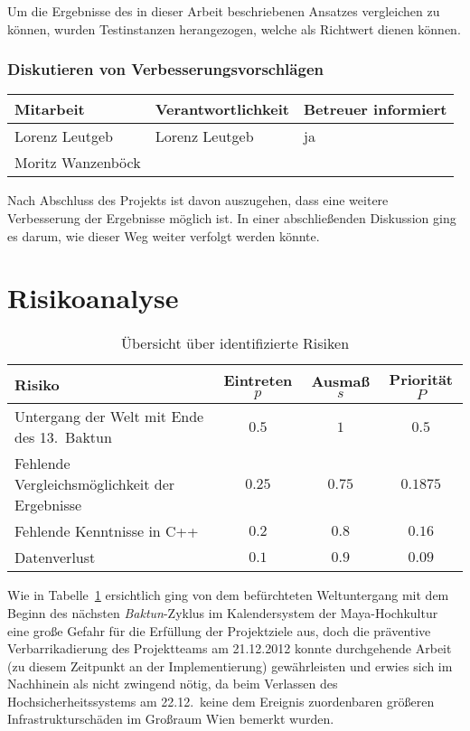 Um die Ergebnisse des in dieser Arbeit beschriebenen Ansatzes vergleichen zu können, wurden Testinstanzen herangezogen, welche als Richtwert dienen können.

\subsubsection{ Diskutieren von Verbesserungsvorschlägen}

\begin{center}
\begin{tabular}{lll}
	Mitarbeit & Verantwortlichkeit & Betreuer informiert \\
	\hline
	Lorenz Leutgeb & Lorenz Leutgeb & ja \\
	Moritz Wanzenböck & & \\
\end{tabular}
\end{center}

Nach Abschluss des Projekts ist davon auszugehen, dass eine weitere Verbesserung der Ergebnisse möglich ist. In einer abschließenden Diskussion ging es darum, wie dieser Weg weiter verfolgt werden könnte.

\section{Risikoanalyse}
\begin{table}
\centering
\begin{tabular}{lccc}
Risiko & Eintreten $p$ & Ausmaß $s$ & Priorität $P$\\
\hline
Untergang der Welt mit Ende des 13.\ Baktun & $0.5$ & $1$ & $0.5$\\
Fehlende Vergleichsmöglichkeit der Ergebnisse & $0.25$ & $0.75$ & $0.1875$ \\
Fehlende Kenntnisse in C++ & $0.2$ & $0.8$ & $0.16$ \\
Datenverlust & $0.1$ & $0.9$ & $0.09$ \\
\end{tabular}
\caption{Übersicht über identifizierte Risiken}
\label{tab:risk}
\end{table}

Wie in Tabelle~\ref{tab:risk} ersichtlich ging von dem befürchteten Weltuntergang mit dem Beginn des nächsten \textit{Baktun}-Zyklus im Kalendersystem der Maya-Hochkultur eine große Gefahr für die Erfüllung der Projektziele aus, doch die präventive Verbarrikadierung des Projektteams am 21.12.2012 konnte  durchgehende Arbeit (zu diesem Zeitpunkt an der Implementierung) gewährleisten und erwies sich im Nachhinein als nicht zwingend nötig, da beim Verlassen des Hochsicherheitssystems am 22.12.\ keine dem Ereignis zuordenbaren größeren Infrastrukturschäden im Großraum Wien bemerkt wurden.

